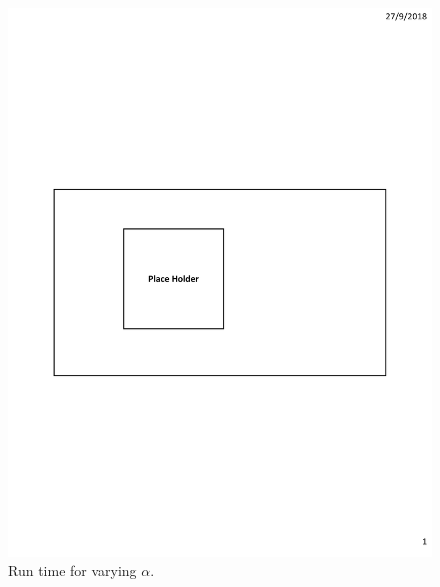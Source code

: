 \begin{figure}[h]
\begin{minipage}{0.18\linewidth}
		\includegraphics[width=\linewidth]{fig/PlaceHolder.pdf}
		\centerline{\dsrandom}
	\end{minipage}
	\caption{Run time for varying $\alpha$.}
	\label{fig:vary-alpha-time}
\end{figure}

